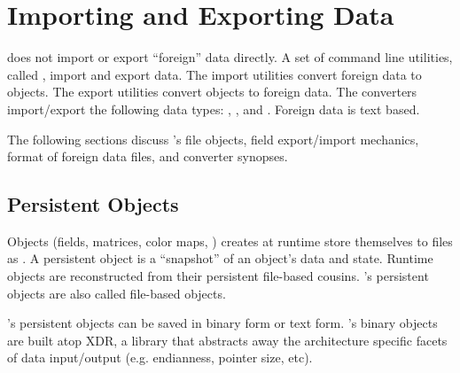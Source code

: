 %
%
%
%
%

\section{Importing and Exporting \sr{} Data}
\label{sec:import_export} 

\sr{} does not import or export ``foreign'' data directly. A set of
command line utilities, called , import and export
data.  The import utilities convert foreign data to \sr{}  
objects.  The export utilities convert \sr{} objects to
foreign data. The converters import/export the following \sr{} data
types: , , and .
Foreign data is text based.

The following sections discuss \sr{}'s file objects, field
export/import mechanics, format of foreign data files, and converter
synopses.


\subsection{\sr{} Persistent Objects}
\label{sec:sr_file_object}

Objects (fields, matrices, color maps, \etc) \sr{} creates at runtime
store themselves to files as .  A persistent
object is a ``snapshot'' of an object's data and state.  Runtime
objects are reconstructed from their persistent file-based cousins.
\sr{}'s persistent objects are also called \sr{} file-based objects.

\sr{}'s persistent objects can be saved in binary form or text form.
\sr{}'s binary objects are built atop XDR, a library that abstracts
away the architecture specific facets of data input/output (e.g.
endianness, pointer size, etc).


